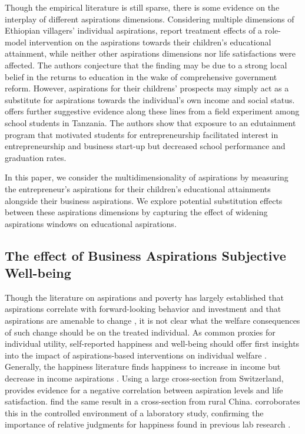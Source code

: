 \documentclass[11.5pt]{article}
\begin{document}
Though the empirical literature is still sparse, there is some evidence on the interplay of different aspirations dimensions. Considering multiple dimensions of Ethiopian villagers' individual aspirations, \citet{Bernard2014} report treatment effects of a role-model intervention on the aspirations towards their children's educational attainment, while neither other aspirations dimensions nor life satisfactions were affected. The authors conjecture that the finding may be due to a strong local belief in the returns to education in the wake of comprehensive government reform. However, aspirations for their childrens' prospects may simply act as a substitute for aspirations towards the individual's own income and social status. \citet{Bjorvatn2015} offers further suggestive evidence along these lines from a field experiment among school students in Tanzania. The authors show that exposure to an edutainment program that motivated students for entrepreneurship facilitated interest in entrepreneurship and business start-up but decreased school performance and graduation rates.

In this paper, we consider the multidimensionality of aspirations by measuring the entrepreneur's aspirations for their children's educational attainments alongside their business aspirations. We explore potential substitution effects between these aspirations dimensions by capturing the effect of widening aspirations windows on educational aspirations.


\subsection{The effect of Business Aspirations Subjective Well-being}

Though the literature on aspirations and poverty has largely established that aspirations correlate with forward-looking behavior and investment \citep[see, e.g.,][]{Janzen2017, Dalton2018, Kosec2017, Favara2017, Ross2017, Serneels2014} and that aspirations are amenable to change \citep[e.g.,][]{Bernard2014, Macours2014, Beaman2012, McBride2010}, it is not clear what the welfare consequences of such change should be on the treated individual. As common proxies for individual utility, self-reported happiness and well-being should offer first insights into the impact of aspirations-based interventions on individual welfare \citep[see, e.g.,][]{Clark1994, Oswald1997, Ng1997, Easterlin2001, Stutzer2004, Frey2000, Frey2002}. Generally, the happiness literature finds happiness to increase in income but decrease in income aspirations \citep[e.g.,][]{Easterlin1995, Easterlin2001, Easterlin2003, Stutzer2004, Knight2012, Clark2008, Frey2002}. Using a large cross-section from Switzerland, \citet[][]{Stutzer2004} provides evidence for a negative correlation between aspiration levels and life satisfaction. \citet{Knight2012} find the same result in a cross-section from rural China. \citet{McBride2010} corroborates this in the controlled environment of a laboratory study, confirming the importance of relative judgments for happiness found in previous lab research \citep[see, e.g.,][]{Tversky1991, Smith1989}.
\end{document}

